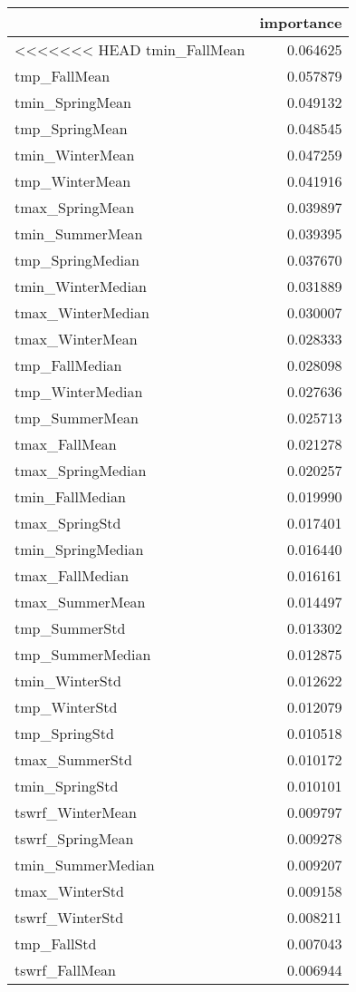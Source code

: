 \begin{tabular}{lr}
\toprule
 & importance \\
\midrule
<<<<<<< HEAD
tmin_FallMean & 0.064625 \\
tmp_FallMean & 0.057879 \\
tmin_SpringMean & 0.049132 \\
tmp_SpringMean & 0.048545 \\
tmin_WinterMean & 0.047259 \\
tmp_WinterMean & 0.041916 \\
tmax_SpringMean & 0.039897 \\
tmin_SummerMean & 0.039395 \\
tmp_SpringMedian & 0.037670 \\
tmin_WinterMedian & 0.031889 \\
tmax_WinterMedian & 0.030007 \\
tmax_WinterMean & 0.028333 \\
tmp_FallMedian & 0.028098 \\
tmp_WinterMedian & 0.027636 \\
tmp_SummerMean & 0.025713 \\
tmax_FallMean & 0.021278 \\
tmax_SpringMedian & 0.020257 \\
tmin_FallMedian & 0.019990 \\
tmax_SpringStd & 0.017401 \\
tmin_SpringMedian & 0.016440 \\
tmax_FallMedian & 0.016161 \\
tmax_SummerMean & 0.014497 \\
tmp_SummerStd & 0.013302 \\
tmp_SummerMedian & 0.012875 \\
tmin_WinterStd & 0.012622 \\
tmp_WinterStd & 0.012079 \\
tmp_SpringStd & 0.010518 \\
tmax_SummerStd & 0.010172 \\
tmin_SpringStd & 0.010101 \\
tswrf_WinterMean & 0.009797 \\
tswrf_SpringMean & 0.009278 \\
tmin_SummerMedian & 0.009207 \\
tmax_WinterStd & 0.009158 \\
tswrf_WinterStd & 0.008211 \\
tmp_FallStd & 0.007043 \\
tswrf_FallMean & 0.006944 \\

\end{tabular}
